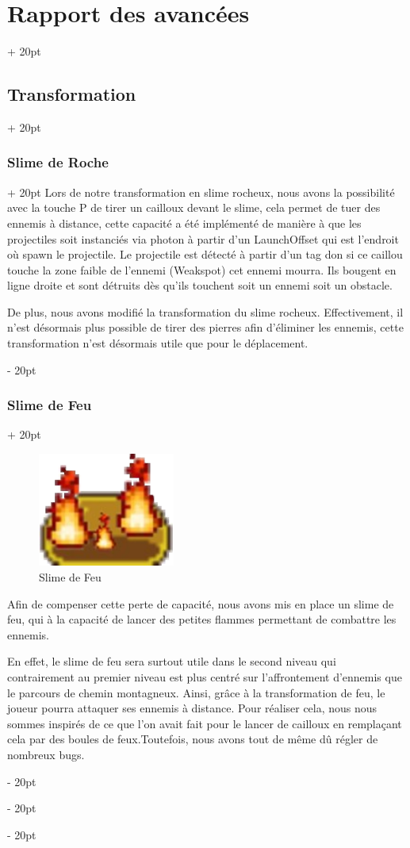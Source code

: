 \documentclass[a4paper, 12pt, twoside]{article}
\newcommand{\ind}[1][20pt]{\advance\leftskip + #1}
\newcommand{\deind}[1][20pt]{\advance\leftskip - #1}
\newenvironment{indt}[2][20pt]{#2 \par \ind[#1]}{\par \deind} %
\begin{document}
\begin{indt}{\section{Rapport des avancées}}
\begin{indt}{\subsection{Transformation}}
\begin{indt}{\subsubsection{Slime de Roche}}
                Lors de notre transformation en slime rocheux, nous avons la possibilité avec la touche P de tirer un cailloux devant le slime, cela permet de tuer des ennemis à distance, cette capacité a été implémenté de manière à que les projectiles soit instanciés via photon à partir d’un LaunchOffset qui est l’endroit où spawn le projectile. Le projectile est détecté à partir d’un tag don si ce caillou touche la zone faible de l’ennemi (Weakspot) cet ennemi mourra.
                Ils bougent en ligne droite et sont détruits dès qu’ils touchent soit un ennemi soit un obstacle.

                De plus, nous avons modifié la transformation du slime rocheux. Effectivement, il n’est désormais plus possible de tirer des pierres afin d’éliminer les ennemis, cette transformation n’est désormais utile que pour le déplacement.
            \end{indt}

            \begin{indt}{\subsubsection{Slime de Feu}}
                \begin{figure}[h]
                    \centering
                    \includegraphics[width=0.4\textwidth]{SlimeDeFeu.png}
                    \caption{Slime de Feu}
                    \label{fig:mesh1}
                \end{figure}

                Afin de compenser cette perte de capacité, nous avons mis en place un slime de feu, qui à la capacité de lancer des petites flammes permettant de combattre les ennemis.

                En effet, le slime de feu sera surtout utile dans le second niveau qui contrairement au premier niveau est plus centré sur l’affrontement d’ennemis que le parcours de chemin montagneux. Ainsi, grâce à la transformation de feu, le joueur pourra attaquer ses ennemis à distance. Pour réaliser cela, nous nous sommes inspirés de ce que l’on avait fait pour le lancer de cailloux en remplaçant cela par des boules de feux.Toutefois, nous avons tout de même dû régler de nombreux bugs.


\end{indt}
\end{indt}
\end{indt}
\end{document}
